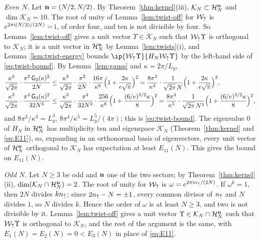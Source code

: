 \emph{Even $N$.} Let $\mathbf{n}=(N/2,N/2)$. By Theorem~\ref{thm:kernel}(iii), $\mathcal K_N\subset\mathcal{H}_N^{\mathbf{n}}$ and
$\dim\mathcal K_N=10$. The root of unity of Lemma~\ref{lem:twist-off} for $\mathcal W_{\uparrow}$ is
$e^{2\pi\mathrm{i}(N/2)/(2N)}=\mathrm{i}$, of order four, and ten is not divisible by four. So Lemma~\ref{lem:twist-off} gives a unit
vector $\Upsilon\in\mathcal K_N$ such that $\mathcal W_{\uparrow}\Upsilon$ is orthogonal to $\mathcal K_N$; it is a unit vector in $\mathcal{H}_N^{\mathbf{n}}$
by Lemma~\ref{lem:twists}(i), and Lemma~\ref{lem:twist-energy} bounds $\ip{\mathcal W_\up\Upsilon}{H_N\mathcal W_\up\Upsilon}$ by the left-hand
side of \eqref{eq:twist-bound}. By Lemma~\ref{lem:gauss} and $\kappa=2\pi/L_y$,
\begin{align*}
\frac{\kappa^3}{\sqrt{2\pi}}\cdot\frac{\pi^2\,\mathsf G_2(\kappa)^2}{2N}&\le\frac{\kappa^3}{\sqrt{2\pi}}\cdot\frac{\pi^2}{2N}\cdot\frac{16\pi}{\kappa^6}\Bigl(1+\frac{2\kappa}{e\sqrt\pi}\Bigr)^2
=\frac{8\pi^3}{\kappa^3}\cdot\frac1{\sqrt{2\pi}\,N}\Bigl(1+\frac{2\kappa}{e\sqrt\pi}\Bigr)^2,\\
\frac{\kappa^3}{\sqrt{2\pi}}\cdot\frac{\pi^4\,\mathsf G_3(\kappa)^2}{32N^3}&\le\frac{\kappa^3}{\sqrt{2\pi}}\cdot\frac{\pi^4}{32N^3}\cdot\frac{256}{\kappa^8}\Bigl(1+\frac{(6/e)^{3/2}\kappa}8\Bigr)^2
=\frac{8\pi^4}{\kappa^5}\cdot\frac1{\sqrt{2\pi}\,N^3}\Bigl(1+\frac{(6/e)^{3/2}\kappa}8\Bigr)^2,
\end{align*}
and $8\pi^3/\kappa^3=L_y^3$, $8\pi^4/\kappa^5=L_y^5/(4\pi)$; this is \eqref{eq:twist-bound}. The eigenvalue $0$ of $H_N$ in
$\mathcal{H}_N^{\mathbf{n}}$ has multiplicity ten and eigenspace $\mathcal K_N$ (Theorem~\ref{thm:kernel} and \eqref{eq:E11}), so, expanding in
an orthonormal basis of eigenvectors, every unit vector of $\mathcal{H}_N^{\mathbf{n}}$ orthogonal to $\mathcal K_N$ has expectation at least
$E_{11}(N)$. This gives the bound on $E_{11}(N)$.

\emph{Odd $N$.} Let $N\ge3$ be odd and $\mathbf{n}$ one of the two sectors; by Theorem~\ref{thm:kernel}(ii),
$\dim(\mathcal K_N\cap\mathcal{H}_N^{\mathbf{n}})=2$. The root of unity for $\mathcal W_{\uparrow}$ is $\omega=e^{2\pi\mathrm{i} n_{\uparrow}/(2N)}$. If $\omega^k=1$,
then $2N$ divides $kn_{\uparrow}$; since $2n_{\uparrow}-N=\pm1$, every common divisor of $n_{\uparrow}$ and $N$ divides $1$, so $N$ divides $k$.
Hence the order of $\omega$ is at least $N\ge3$, and two is not divisible by it. Lemma~\ref{lem:twist-off} gives a unit vector
$\Upsilon\in\mathcal K_N\cap\mathcal{H}_N^{\mathbf{n}}$ such that $\mathcal W_{\uparrow}\Upsilon$ is orthogonal to $\mathcal K_N$, and the rest of the argument is
the same, with $E_1(N)=E_2(N)=0<E_3(N)$ in place of \eqref{eq:E11}.

